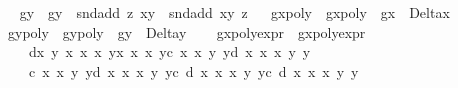 \begin{isabellebody}
\ \isamarkupfalse%
\ g\isactrlsub y\ \ {\isachardoublequoteopen}g\isactrlsub y\ {\isacharequal}\ snd{\isacharparenleft}add\ z{}{\isacharprime}\ {\isacharparenleft}x{}{\isacharcomma}y{}{\isacharparenright}{\isacharparenright}\ {\isacharminus}\ snd{\isacharparenleft}add\ {\isacharparenleft}x{}{\isacharcomma}y{}{\isacharparenright}\ z{}{\isacharprime}{\isacharparenright}{\isachardoublequoteclose}\isanewline
\ \isamarkupfalse%
\ gxpoly\ \ {\isachardoublequoteopen}gxpoly\ {\isacharequal}\ g\isactrlsub x\ {\isacharasterisk}\ Delta\isactrlsub x{\isachardoublequoteclose}\isanewline
\ \ \isamarkupfalse%
\ gypoly\ \ {\isachardoublequoteopen}gypoly\ {\isacharequal}\ g\isactrlsub y\ {\isacharasterisk}\ Delta\isactrlsub y{\isachardoublequoteclose}\isanewline
\isanewline
\ \ \isamarkupfalse%
\ gxpoly{\isacharunderscore}expr\ \ {\isachardoublequoteopen}gxpoly{\isacharunderscore}expr\ {\isacharequal}\ \isanewline
\ \ \ \ d{\isacharasterisk}x{}{\isacharasterisk}\ y{}{\isacharasterisk}\ {\isacharparenleft}x{}{\isacharcircum}{}{\isacharasterisk}\ x{}{\isacharasterisk}\ x{}{\isacharasterisk}\ y{}{\isacharminus}x{}{\isacharcircum}{}{\isacharasterisk}\ x{}{\isacharasterisk}\ x{}{\isacharcircum}{}{\isacharasterisk}\ y{}{\isacharminus}c{\isacharasterisk}\ x{}{\isacharasterisk}\ x{}{\isacharasterisk}\ y{}{\isacharcircum}{}{\isacharasterisk}\ y{}{\isacharplus}d{\isacharasterisk}\ x{}{\isacharcircum}{}{\isacharasterisk}\ x{}{\isacharcircum}{}{\isacharasterisk}\ x{}{\isacharasterisk}\ y{}{\isacharcircum}{}{\isacharasterisk}\ y{}\isanewline
\ \ \ \ {\isacharplus}c{\isacharasterisk}\ x{}{\isacharasterisk}\ x{}{\isacharcircum}{}{\isacharasterisk}\ y{}{\isacharcircum}{}{\isacharasterisk}\ y{}{\isacharminus}d{\isacharasterisk}\ x{}{\isacharcircum}{}{\isacharasterisk}\ x{}{\isacharcircum}{}{\isacharasterisk}\ x{}{\isacharcircum}{}{\isacharasterisk}\ y{}{\isacharcircum}{}{\isacharasterisk}\ y{}{\isacharminus}c{\isacharasterisk}\ d{\isacharasterisk}\ x{}{\isacharcircum}{}{\isacharasterisk}\ x{}{\isacharasterisk}\ x{}{\isacharasterisk}\ y{}{\isacharcircum}{}{\isacharasterisk}\ y{}{\isacharcircum}{}{\isacharplus}c{\isacharasterisk}\ d{\isacharasterisk}\ x{}{\isacharcircum}{}{\isacharasterisk}\ x{}{\isacharasterisk}\ x{}{\isacharcircum}{}{\isacharasterisk}\ y{}{\isacharcircum}{}{\isacharasterisk}\ y{}{\isacharcircum}{}\isanewline

\end{isabellebody}

